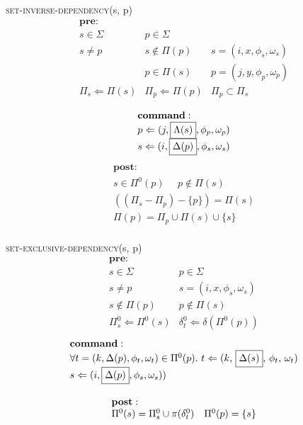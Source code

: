\documentclass[10pt]{article}
\begin{document}
{\textsc{set-inverse-dependency}}(s, p)\\
\[
\begin{array}{lll}
\mathbf{pre}:&\\
  s \in \Sigma & p \in \Sigma &\\
  s \neq p & s \notin \Pi(p) & s = (i, x, \phi_s, \omega_s)\\
   & p \in \Pi(s) & p = (j, y, \phi_p, \omega_p)\\
  \Pi_s \Leftarrow \Pi(s) & \Pi_p \Leftarrow \Pi(p) & \Pi_p \subset \Pi_s\\
\end{array}
\]
\noindent\[
\begin{array}{l}
\mathbf{command}:\\
  p \Leftarrow (j, \fbox{$\Lambda(s)$}, \phi_p, \omega_p)\\
  s \Leftarrow (i, \fbox{$\Delta(p)$}, \phi_s, \omega_s)\\
\end{array}
\]
\[
\begin{array}{l}
\mathbf{post}:\\
  s \in \Pi^0(p)  \ \ \ \ \ \ p \notin \Pi(s)\\
  ((\Pi_s - \Pi_p) - \{p\}) = \Pi(s)\\
  \Pi(p) = \Pi_p \cup \Pi(s) \cup \{s\}\\
\end{array}
\]



{\textsc{set-exclusive-dependency}}(s, p)\\
\[
\begin{array}{ll}
\mathbf{pre}:\\
   s \in \Sigma & p \in \Sigma\\
   s \neq p & s = (i, x, \phi_s, \omega_s)\\
   s \notin \Pi(p)  & p \notin \Pi(s)\\
   \Pi^0_s \Leftarrow \Pi^0(s) & \delta^0_t \Leftarrow \delta(\Pi^0(p))
\end{array}
\]
\[
\begin{array}{l}
   \mathbf{command}:\\
   \forall t = (k, \Delta(p), \phi_t, \omega_t) \in \Pi^0(p).\ t \Leftarrow (k,\,\fbox{$\Delta(s)$},\,\phi_t,\, \omega_t)\\
   s \Leftarrow (i, \fbox{$\Delta(p)$}, \phi_s, \omega_s))
\end{array}
\]
\[
\begin{array}{ll}
\rule{0mm}{5mm}
   \mathbf{post}:\\
   \Pi^0(s) = \Pi^0_s \cup \pi(\delta^0_t)  & \Pi^0(p) = \{ s \}\\
\end{array}
\]
\end{document}
